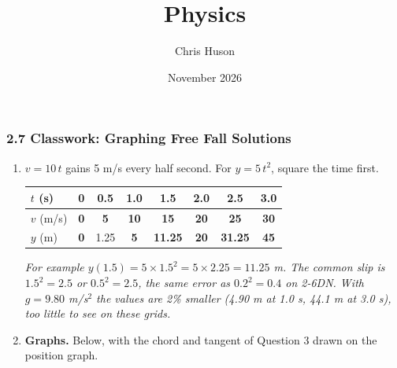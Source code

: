 \documentclass[12pt, twoside]{article}
\title{Physics}
\author{Chris Huson}
\date{November 2026}
\begin{document}
\subsubsection*{2.7 Classwork: Graphing Free Fall Solutions}

\begin{enumerate}[itemsep=0.4cm]

\item $v = 10\,t$ gains 5 m/s every half second. For $y = 5\,t^2$, square the time
  first.

  {\renewcommand{\arraystretch}{1.4}%
  \begin{tabular}{| l | c | c | c | c | c | c | c |}
    \hline
    $t$ (s) & 0 & 0.5 & 1.0 & 1.5 & 2.0 & 2.5 & 3.0 \\ \hline
    $v$ (m/s) & \textbf{0} & \textbf{5} & \textbf{10} & \textbf{15} & \textbf{20} &
      \textbf{25} & \textbf{30} \\ \hline
    $y$ (m) & \textbf{0} & 1.25 & \textbf{5} & \textbf{11.25} & \textbf{20} &
      \textbf{31.25} & \textbf{45} \\ \hline
  \end{tabular}}

  \emph{For example $y(1.5) = 5 \times 1.5^2 = 5 \times 2.25 = 11.25$ m. The common
  slip is $1.5^2 = 2.5$ or $0.5^2 = 2.5$, the same error as $0.2^2 = 0.4$ on 2-6DN.
  With $g = 9.80$ m/s$^2$ the values are 2\% smaller (4.90 m at 1.0 s, 44.1 m at
  3.0 s), too little to see on these grids.}

\item \textbf{Graphs.} Below, with the chord and tangent of Question 3 drawn on the
  position graph.


\end{enumerate}
\end{document}
